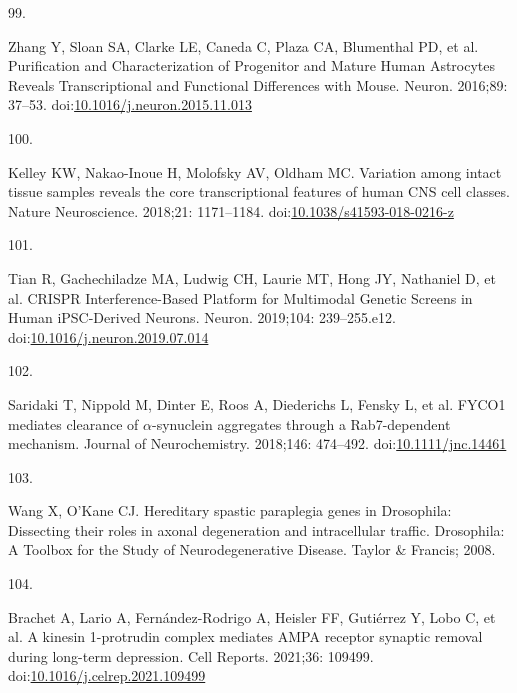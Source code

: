 \documentclass[
  12pt,
  a4paper,
]{book}
\newlength{\cslhangindent}
\newlength{\csllabelwidth}
\newlength{\cslentryspacingunit} %
\newenvironment{CSLReferences}[2] %
 {%
  \setlength{\parindent}{0pt}
  \ifodd #1
  \let\oldpar\par
  \def\par{\hangindent=\cslhangindent\oldpar}
  \fi
  \setlength{\parskip}{#2\cslentryspacingunit}
 }%
 {}
\newcommand{\CSLLeftMargin}[1]{\parbox[t]{\csllabelwidth}{#1}}
\newcommand{\CSLRightInline}[1]{\parbox[t]{\linewidth - \csllabelwidth}{#1}\break}
\begin{document}
\begin{CSLReferences}{0}{0}
\leavevmode{}%
\CSLLeftMargin{99. }%
\CSLRightInline{Zhang Y, Sloan SA, Clarke LE, Caneda C, Plaza CA, Blumenthal PD, et al. Purification and {Characterization} of {Progenitor} and {Mature Human Astrocytes Reveals Transcriptional} and {Functional Differences} with {Mouse}. Neuron. 2016;89: 37--53. doi:\href{https://doi.org/10.1016/j.neuron.2015.11.013}{10.1016/j.neuron.2015.11.013}}

\leavevmode{}%
\CSLLeftMargin{100. }%
\CSLRightInline{Kelley KW, Nakao-Inoue H, Molofsky AV, Oldham MC. Variation among intact tissue samples reveals the core transcriptional features of human {CNS} cell classes. Nature Neuroscience. 2018;21: 1171--1184. doi:\href{https://doi.org/10.1038/s41593-018-0216-z}{10.1038/s41593-018-0216-z}}

\leavevmode{}%
\CSLLeftMargin{101. }%
\CSLRightInline{Tian R, Gachechiladze MA, Ludwig CH, Laurie MT, Hong JY, Nathaniel D, et al. {CRISPR Interference-Based Platform} for {Multimodal Genetic Screens} in {Human iPSC-Derived Neurons}. Neuron. 2019;104: 239--255.e12. doi:\href{https://doi.org/10.1016/j.neuron.2019.07.014}{10.1016/j.neuron.2019.07.014}}

\leavevmode{}%
\CSLLeftMargin{102. }%
\CSLRightInline{Saridaki T, Nippold M, Dinter E, Roos A, Diederichs L, Fensky L, et al. {FYCO1} mediates clearance of {\(\alpha\)}-synuclein aggregates through a {Rab7-dependent} mechanism. Journal of Neurochemistry. 2018;146: 474--492. doi:\href{https://doi.org/10.1111/jnc.14461}{10.1111/jnc.14461}}

\leavevmode{}%
\CSLLeftMargin{103. }%
\CSLRightInline{Wang X, O'Kane CJ. Hereditary spastic paraplegia genes in {Drosophila}: Dissecting their roles in axonal degeneration and intracellular traffic. Drosophila: {A Toolbox} for the {Study} of {Neurodegenerative Disease}. {Taylor \& Francis}; 2008. }

\leavevmode{}%
\CSLLeftMargin{104. }%
\CSLRightInline{Brachet A, Lario A, Fernández-Rodrigo A, Heisler FF, Gutiérrez Y, Lobo C, et al. A kinesin 1-protrudin complex mediates {AMPA} receptor synaptic removal during long-term depression. Cell Reports. 2021;36: 109499. doi:\href{https://doi.org/10.1016/j.celrep.2021.109499}{10.1016/j.celrep.2021.109499}}


\end{CSLReferences}
\end{document}
